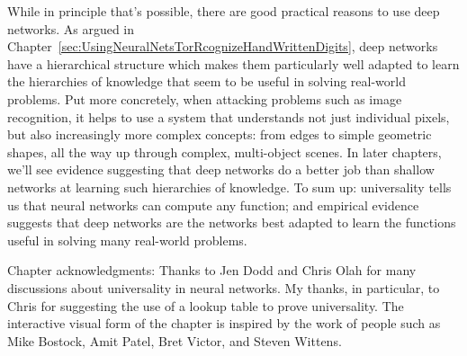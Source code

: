 While in principle that's possible, there are good practical reasons to use deep networks. As argued in Chapter~\ref{sec:UsingNeuralNetsTorRcognizeHandWrittenDigits}, deep networks have a hierarchical structure which makes them particularly well adapted to learn the hierarchies of knowledge that seem to be useful in solving real-world problems. Put more concretely, when attacking problems such as image recognition, it helps to use a system that understands not just individual pixels, but also increasingly more complex concepts: from edges to simple geometric shapes, all the way up through complex, multi-object scenes. In later chapters, we'll see evidence suggesting that deep networks do a better job than shallow networks at learning such hierarchies of knowledge. To sum up: universality tells us that neural networks can compute any function; and empirical evidence suggests that deep networks are the networks best adapted to learn the functions useful in solving many real-world problems.


Chapter acknowledgments: Thanks to Jen Dodd and Chris Olah for many discussions about universality in neural networks. My thanks, in particular, to Chris for suggesting the use of a lookup table to prove universality. The interactive visual form of the chapter is inspired by the work of people such as Mike Bostock, Amit Patel, Bret Victor, and Steven Wittens. 

